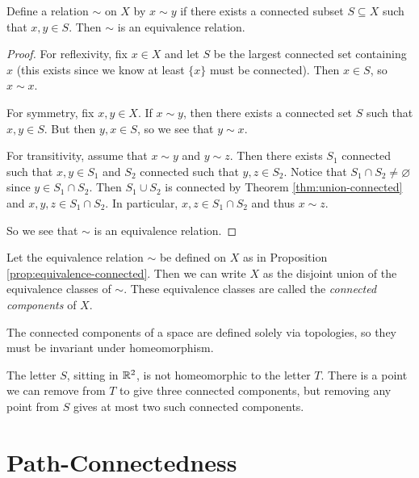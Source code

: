 \begin{prop}
  \label{prop:equivalence-connected}
  Define a relation $\sim$ on $X$ by $x \sim y$
  if there exists a connected subset
  $S \subseteq X$ such that $x, y \in S$.
  Then $\sim$ is an equivalence relation.
\end{prop}

\begin{proof}
  For reflexivity, fix $x \in X$ and let
  $S$ be the largest connected set containing
  $x$ (this exists since we know at least
  $\{x\}$ must be
  connected). Then $x \in S$, so $x \sim x$.

  For symmetry, fix $x, y \in X$. If $x \sim y$,
  then there exists a connected set $S$ such that
  $x, y \in S$. But then $y, x \in S$, so we see that
  $y \sim x$.

  For transitivity, assume that $x \sim y$
  and $y \sim z$. Then there exists $S_1$
  connected such that $x, y \in S_1$ and $S_2$
  connected such that $y, z \in S_2$. Notice
  that $S_1 \cap S_2 \ne \varnothing$ since
  $y \in S_1 \cap S_2$. Then $S_1 \cup S_2$ is
  connected by Theorem \ref{thm:union-connected}
  and $x, y, z \in S_1 \cap S_2$. In particular,
  $x, z \in S_1 \cap S_2$ and thus $x \sim z$.

  So we see that $\sim$ is an equivalence relation.
\end{proof}

\begin{definition}
  Let the equivalence relation $\sim$ be defined
  on $X$ as in Proposition \ref{prop:equivalence-connected}.
  Then we can write $X$ as the disjoint union of
  the equivalence classes of $\sim$.
  These
  equivalence classes are called
  the \emph{connected components} of $X$.
\end{definition}

\begin{remark}
  The connected components of a space are defined
  solely
  via topologies, so they must be invariant under
  homeomorphism.
\end{remark}

\begin{example}
  The letter $S$, sitting in $\mathbb{R}^2$, is not
  homeomorphic to the letter $T$. There is a point
  we can remove from $T$ to give three connected
  components, but removing any point from $S$ gives
  at most two such connected components.
\end{example}

\section{Path-Connectedness}

